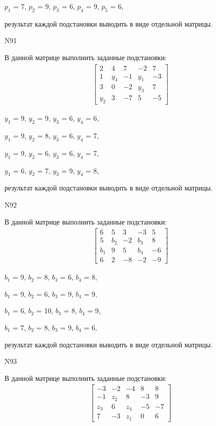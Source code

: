 \documentclass[11pt]{report}
\begin{document}
$p_{1}$ = 7, $p_{2}$ = 9, $p_{3}$ = 6, $p_{4}$ = 9, $p_{5}$ = 6, 

результат каждой подстановки выводить в виде отдельной матрицы.

N91

В данной матрице выполнить заданные подстановки:
\begin{align*}
\left[\begin{matrix}2 & 4 & 7 & -2 & 7\\1 & y_{4} & -1 & y_{1} & -3\\3 & 0 & -2 & y_{3} & 7\\y_{2} & 3 & -7 & 5 & -5\end{matrix}\right]
\end{align*}


$y_{1}$ = 9, $y_{2}$ = 9, $y_{3}$ = 6, $y_{4}$ = 6, 

$y_{1}$ = 9, $y_{2}$ = 8, $y_{3}$ = 6, $y_{4}$ = 7, 

$y_{1}$ = 9, $y_{2}$ = 6, $y_{3}$ = 6, $y_{4}$ = 7, 

$y_{1}$ = 6, $y_{2}$ = 7, $y_{3}$ = 9, $y_{4}$ = 8, 

результат каждой подстановки выводить в виде отдельной матрицы.

N92

В данной матрице выполнить заданные подстановки:
\begin{align*}
\left[\begin{matrix}6 & 5 & 3 & -3 & 5\\5 & b_{2} & -2 & b_{3} & 8\\b_{1} & 9 & 5 & b_{4} & -6\\6 & 2 & -8 & -2 & -9\end{matrix}\right]
\end{align*}


$b_{1}$ = 9, $b_{2}$ = 8, $b_{3}$ = 6, $b_{4}$ = 8, 

$b_{1}$ = 9, $b_{2}$ = 6, $b_{3}$ = 9, $b_{4}$ = 9, 

$b_{1}$ = 6, $b_{2}$ = 10, $b_{3}$ = 8, $b_{4}$ = 9, 

$b_{1}$ = 7, $b_{2}$ = 8, $b_{3}$ = 9, $b_{4}$ = 6, 

результат каждой подстановки выводить в виде отдельной матрицы.

N93

В данной матрице выполнить заданные подстановки:
\begin{align*}
\left[\begin{matrix}-3 & -2 & -4 & 8 & 8\\-1 & z_{2} & 8 & -3 & 9\\z_{3} & 6 & z_{4} & -5 & -7\\7 & -3 & z_{1} & 0 & 6\end{matrix}\right]
\end{align*}
\end{document}
